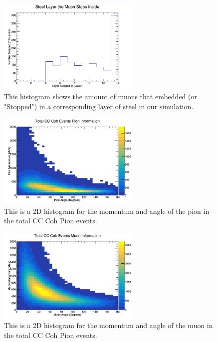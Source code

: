 \documentclass[11pt]{article}
\begin{document}
\begin{figure}[H]
\centering
\includegraphics[width=0.6\textwidth]{NewNMBergerSehgalImages/7-LayerPenetrationNMBS.png}
\caption{This histogram shows the amount of muons that embedded (or "Stopped") in a corresponding layer of steel in our simulation.}
\end{figure}

\begin{figure}[H]
\centering
\includegraphics[width=0.6\textwidth]{NewNMBergerSehgalImages/8-TotalCCCohPionInfoNMBS.png}
\caption{This is a 2D histogram for the momentum and angle of the pion in the total CC Coh Pion events.}
\end{figure}

\begin{figure}[H]
\centering
\includegraphics[width=0.6\textwidth]{NewNMBergerSehgalImages/9-TotalCCCohMuonInfoNMBS.png}
\caption{This is a 2D histogram for the momentum and angle of the muon in the total CC Coh Pion events.}
\end{figure}
\end{document}
